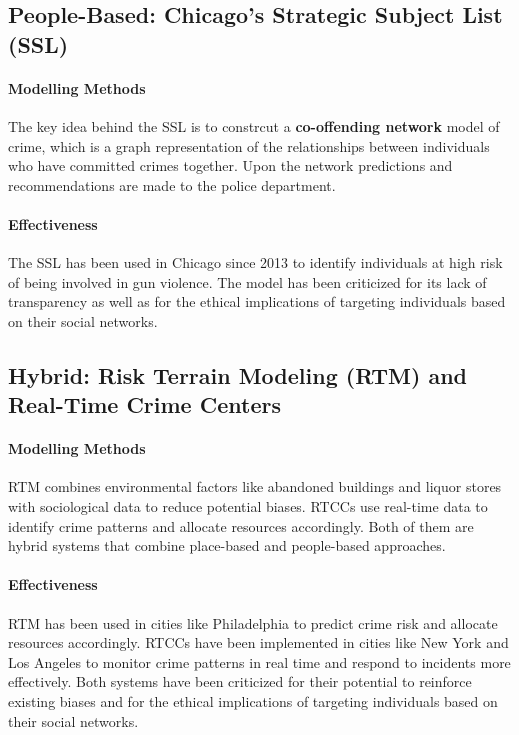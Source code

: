 \documentclass[11pt]{article}
\begin{document}
\subsection{People-Based: Chicago's Strategic Subject List (SSL)}
\paragraph{Modelling Methods} The key idea behind the SSL is to constrcut a \textbf{co-offending network} model of crime\cite{tayebi2016social,burcher2020social}, which is a graph representation of the relationships between individuals who have committed crimes together. Upon the network predictions and recommendations are made to the police department.

\paragraph{Effectiveness} The SSL has been used in Chicago since 2013 to identify individuals at high risk of being involved in gun violence. The model has been criticized for its lack of transparency as well as for the ethical implications of targeting individuals based on their social networks. 

\subsection{Hybrid: Risk Terrain Modeling (RTM) and Real-Time Crime Centers}
\paragraph{Modelling Methods} RTM\cite{caplan2011risk} combines environmental factors like abandoned buildings and liquor stores with sociological data to reduce potential biases. RTCCs\cite{ratcliffe2011philadelphia} use real-time data to identify crime patterns and allocate resources accordingly. Both of them are hybrid systems that combine place-based and people-based approaches.

\paragraph{Effectiveness} RTM has been used in cities like Philadelphia to predict crime risk and allocate resources accordingly. RTCCs have been implemented in cities like New York and Los Angeles to monitor crime patterns in real time and respond to incidents more effectively. Both systems have been criticized for their potential to reinforce existing biases and for the ethical implications of targeting individuals based on their social networks.
\end{document}
